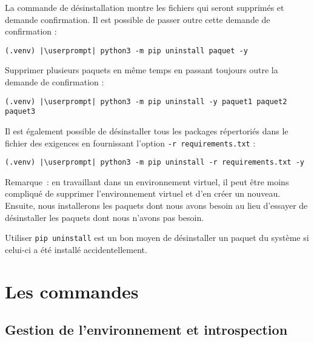 La commande de désinstallation montre les fichiers qui seront supprimés et demande confirmation. Il est possible de passer outre cette demande de confirmation :
\begin{lstlisting}[style=bash]
(.venv) |\userprompt| python3 -m pip uninstall paquet -y
\end{lstlisting}

Supprimer plusieurs paquets en même temps en passant toujours outre la demande de confirmation :
\begin{lstlisting}[style=bash]
(.venv) |\userprompt| python3 -m pip uninstall -y paquet1 paquet2 paquet3
\end{lstlisting}

Il est également possible de désinstaller tous les packages répertoriés dans le fichier des exigences en fournissant l’option \texttt{-r requirements.txt} :
\begin{lstlisting}[style=bash]
(.venv) |\userprompt| python3 -m pip uninstall -r requirements.txt -y 
\end{lstlisting}

Remarque : en travaillant dans un environnement virtuel, il peut être moins compliqué de supprimer l'environnement virtuel et d’en créer un nouveau. Ensuite, nous installerons les paquets dont nous avons besoin au lieu d’essayer de désinstaller les paquets dont nous n’avons pas besoin.

Utiliser \texttt{pip uninstall} est un bon moyen de désinstaller un paquet  du système si celui-ci a été installé accidentellement.

\section{Les commandes}
\subsection*{Gestion de l'environnement et introspection}
